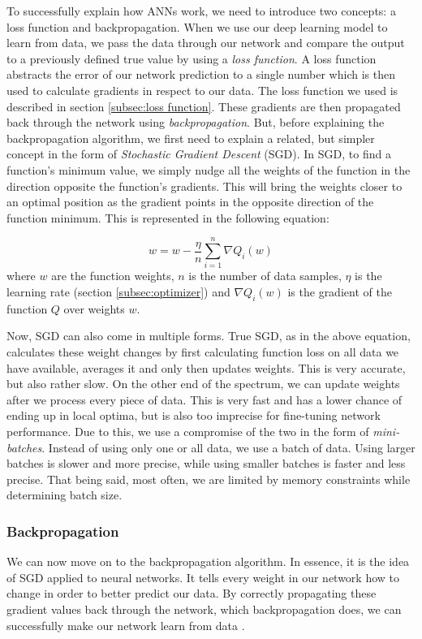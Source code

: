 \documentclass[times, utf8, diplomski, english]{fer_eng}
\begin{document}
To successfully explain how ANNs work, we need to introduce two concepts: a loss function and backpropagation. When we use our deep learning model to learn from data, we pass the data through our network and compare the output to a previously defined true value by using a \textit{loss function}. A loss function abstracts the error of our network prediction to a single number which is then used to calculate gradients in respect to our data. The loss function we used is described in section \ref{subsec:loss function}. These gradients are then propagated back through the network using \textit{backpropagation}. But, before explaining the backpropagation algorithm, we first need to explain a related, but simpler concept in the form of \textit{Stochastic Gradient Descent} (SGD). In SGD, to find a function's minimum value, we simply nudge all the weights of the function in the direction opposite the function's gradients. This will bring the weights closer to an optimal position as the gradient points in the opposite direction of the function minimum. This is represented in the following equation:

\[ w = w - \frac{\eta}{n} \sum_{i=1}^n \nabla Q_i(w) \]
where $w$ are the function weights, $n$ is the number of data samples, $\eta$ is the learning rate (section \ref{subsec:optimizer}) and $\nabla Q_i(w)$ is the gradient of the function $Q$ over weights $w$.

Now, SGD can also come in multiple forms. True SGD, as in the above equation, calculates these weight changes by first calculating function loss on all data we have available, averages it and only then updates weights. This is very accurate, but also rather slow. On the other end of the spectrum, we can update weights after we process every piece of data. This is very fast and has a lower chance of ending up in local optima, but is also too imprecise for fine-tuning network performance. Due to this, we use a compromise of the two in the form of \textit{mini-batches}. Instead of using only one or all data, we use a batch of data. Using larger batches is slower and more precise, while using smaller batches is faster and less precise. That being said, most often, we are limited by memory constraints while determining batch size.

\subsubsection{Backpropagation}

We can now move on to the backpropagation algorithm. In essence, it is the idea of SGD applied to neural networks. It tells every weight in our network how to change in order to better predict our data. By correctly propagating these gradient values back through the network, which backpropagation does, we can successfully make our network learn from data \cite{Goodfellow-et-al-2016}.
\end{document}
